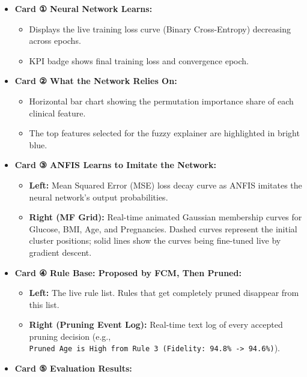 \documentclass[10pt,a4paper]{article}
\providecommand{\tightlist}{\setlength{\itemsep}{1pt}\setlength{\parskip}{1pt}}
\begin{document}
\begin{itemize}
\tightlist
\item
  \textbf{Card ① Neural Network Learns:}

  \begin{itemize}
  \tightlist
  \item
    Displays the live training loss curve (Binary Cross-Entropy)
    decreasing across epochs.
  \item
    KPI badge shows final training loss and convergence epoch.
  \end{itemize}
\item
  \textbf{Card ② What the Network Relies On:}

  \begin{itemize}
  \tightlist
  \item
    Horizontal bar chart showing the permutation importance share of
    each clinical feature.
  \item
    The top features selected for the fuzzy explainer are highlighted in
    bright blue.
  \end{itemize}
\item
  \textbf{Card ③ ANFIS Learns to Imitate the Network:}

  \begin{itemize}
  \tightlist
  \item
    \textbf{Left:} Mean Squared Error (MSE) loss decay curve as ANFIS
    imitates the neural network's output probabilities.
  \item
    \textbf{Right (MF Grid):} Real-time animated Gaussian membership
    curves for Glucose, BMI, Age, and Pregnancies. Dashed curves
    represent the initial cluster positions; solid lines show the curves
    being fine-tuned live by gradient descent.
  \end{itemize}
\item
  \textbf{Card ④ Rule Base: Proposed by FCM, Then Pruned:}

  \begin{itemize}
  \tightlist
  \item
    \textbf{Left:} The live rule list. Rules that get completely pruned
    disappear from this list.
  \item
    \textbf{Right (Pruning Event Log):} Real-time text log of every
    accepted pruning decision (e.g.,
    \texttt{Pruned\ Age\ is\ High\ from\ Rule\ 3\ (Fidelity:\ 94.8\%\ -\textgreater{}\ 94.6\%)}).
  \end{itemize}
\item
  \textbf{Card ⑤ Evaluation Results:}


\end{itemize}
\end{document}
